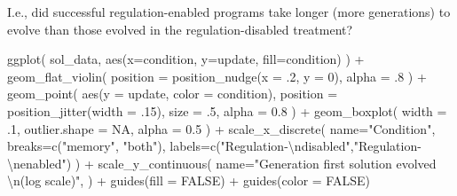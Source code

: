 \documentclass[
]{book}
\newenvironment{Shaded}{\begin{snugshade}}{\end{snugshade}}
\newcommand{\AttributeTok}[1]{\textcolor[rgb]{0.77,0.63,0.00}{#1}}
\newcommand{\ConstantTok}[1]{\textcolor[rgb]{0.00,0.00,0.00}{#1}}
\newcommand{\DecValTok}[1]{\textcolor[rgb]{0.00,0.00,0.81}{#1}}
\newcommand{\FloatTok}[1]{\textcolor[rgb]{0.00,0.00,0.81}{#1}}
\newcommand{\FunctionTok}[1]{\textcolor[rgb]{0.00,0.00,0.00}{#1}}
\newcommand{\NormalTok}[1]{#1}
\newcommand{\SpecialCharTok}[1]{\textcolor[rgb]{0.00,0.00,0.00}{#1}}
\newcommand{\StringTok}[1]{\textcolor[rgb]{0.31,0.60,0.02}{#1}}
\begin{document}
I.e., did successful regulation-enabled programs take longer (more generations) to evolve than those evolved in the regulation-disabled treatment?

\begin{Shaded}
\begin{Highlighting}[]
\FunctionTok{ggplot}\NormalTok{( sol\_data, }\FunctionTok{aes}\NormalTok{(}\AttributeTok{x=}\NormalTok{condition, }\AttributeTok{y=}\NormalTok{update, }\AttributeTok{fill=}\NormalTok{condition) ) }\SpecialCharTok{+}
  \FunctionTok{geom\_flat\_violin}\NormalTok{(}
    \AttributeTok{position =} \FunctionTok{position\_nudge}\NormalTok{(}\AttributeTok{x =}\NormalTok{ .}\DecValTok{2}\NormalTok{, }\AttributeTok{y =} \DecValTok{0}\NormalTok{),}
    \AttributeTok{alpha =}\NormalTok{ .}\DecValTok{8}
\NormalTok{  ) }\SpecialCharTok{+}
  \FunctionTok{geom\_point}\NormalTok{(}
    \FunctionTok{aes}\NormalTok{(}\AttributeTok{y =}\NormalTok{ update, }\AttributeTok{color =}\NormalTok{ condition),}
    \AttributeTok{position =} \FunctionTok{position\_jitter}\NormalTok{(}\AttributeTok{width =}\NormalTok{ .}\DecValTok{15}\NormalTok{),}
    \AttributeTok{size =}\NormalTok{ .}\DecValTok{5}\NormalTok{,}
    \AttributeTok{alpha =} \FloatTok{0.8}
\NormalTok{  ) }\SpecialCharTok{+}
  \FunctionTok{geom\_boxplot}\NormalTok{(}
    \AttributeTok{width =}\NormalTok{ .}\DecValTok{1}\NormalTok{,}
    \AttributeTok{outlier.shape =} \ConstantTok{NA}\NormalTok{,}
    \AttributeTok{alpha =} \FloatTok{0.5}
\NormalTok{  ) }\SpecialCharTok{+}
  \FunctionTok{scale\_x\_discrete}\NormalTok{(}
    \AttributeTok{name=}\StringTok{"Condition"}\NormalTok{,}
    \AttributeTok{breaks=}\FunctionTok{c}\NormalTok{(}\StringTok{"memory"}\NormalTok{, }\StringTok{"both"}\NormalTok{),}
    \AttributeTok{labels=}\FunctionTok{c}\NormalTok{(}\StringTok{"Regulation{-}}\SpecialCharTok{\textbackslash{}n}\StringTok{disabled"}\NormalTok{,}\StringTok{"Regulation{-}}\SpecialCharTok{\textbackslash{}n}\StringTok{enabled"}\NormalTok{)}
\NormalTok{  ) }\SpecialCharTok{+}
  \FunctionTok{scale\_y\_continuous}\NormalTok{(}
    \AttributeTok{name=}\StringTok{"Generation first solution evolved }\SpecialCharTok{\textbackslash{}n}\StringTok{(log scale)"}\NormalTok{,}
\NormalTok{  ) }\SpecialCharTok{+}
  \FunctionTok{guides}\NormalTok{(}\AttributeTok{fill =} \ConstantTok{FALSE}\NormalTok{) }\SpecialCharTok{+}
  \FunctionTok{guides}\NormalTok{(}\AttributeTok{color =} \ConstantTok{FALSE}\NormalTok{)}
\end{Highlighting}
\end{Shaded}
\end{document}
